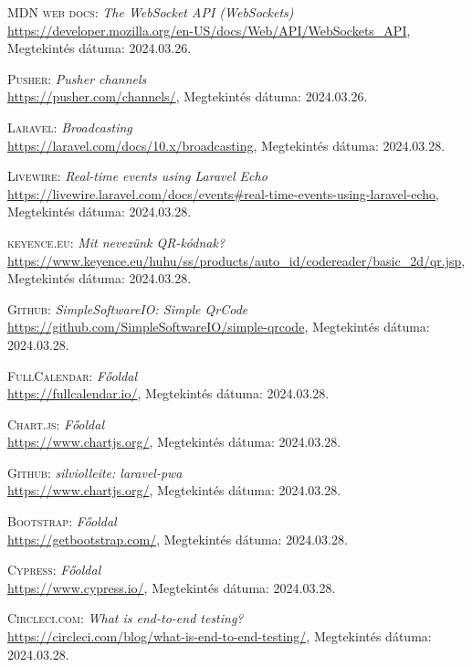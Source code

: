 \documentclass[
]{thesis-ekf}
\theoremstyle{definition}
\theoremstyle{remark}
\begin{document}
\begin{thebibliography}{47}
\textsc{MDN web docs}: \emph{The WebSocket API (WebSockets)}
\\
\url{https://developer.mozilla.org/en-US/docs/Web/API/WebSockets_API}, Megtekintés dátuma: 2024.03.26.

\textsc{Pusher}: \emph{Pusher channels}
\\
\url{https://pusher.com/channels/}, Megtekintés dátuma: 2024.03.26.

\textsc{Laravel}: \emph{Broadcasting}
\\
\url{https://laravel.com/docs/10.x/broadcasting}, Megtekintés dátuma: 2024.03.28.

\textsc{Livewire}: \emph{Real-time events using Laravel Echo}
\\
\url{https://livewire.laravel.com/docs/events#real-time-events-using-laravel-echo}, Megtekintés dátuma: 2024.03.28.

\textsc{keyence.eu}: \emph{Mit nevezünk QR-kódnak?}
\\
\url{https://www.keyence.eu/huhu/ss/products/auto_id/codereader/basic_2d/qr.jsp}, Megtekintés dátuma: 2024.03.28.

\textsc{Github}: \emph{SimpleSoftwareIO: Simple QrCode}
\\
\url{https://github.com/SimpleSoftwareIO/simple-qrcode}, Megtekintés dátuma: 2024.03.28.

\textsc{FullCalendar}: \emph{Főoldal}
\\
\url{https://fullcalendar.io/}, Megtekintés dátuma: 2024.03.28.

\textsc{Chart.js}: \emph{Főoldal}
\\
\url{https://www.chartjs.org/}, Megtekintés dátuma: 2024.03.28.

\textsc{Github}: \emph{silviolleite: laravel-pwa}
\\
\url{https://www.chartjs.org/}, Megtekintés dátuma: 2024.03.28.

\textsc{Bootstrap}: \emph{Főoldal}
\\
\url{https://getbootstrap.com/}, Megtekintés dátuma: 2024.03.28.

\textsc{Cypress}: \emph{Főoldal}
\\
\url{https://www.cypress.io/}, Megtekintés dátuma: 2024.03.28.

\textsc{Circleci.com}: \emph{What is end-to-end testing?}
\\
\url{https://circleci.com/blog/what-is-end-to-end-testing/}, Megtekintés dátuma: 2024.03.28.


\end{thebibliography}
\end{document}
